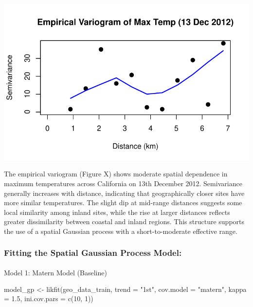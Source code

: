 \documentclass[
  11pt,
]{article}
\makeatletter
\let\oldparagraph\paragraph
\renewcommand{\paragraph}{
    \@ifstar
      \xxxParagraphStar
      \xxxParagraphNoStar
  }
\newcommand{\xxxParagraphStar}[1]{\oldparagraph*{#1}\mbox{}}
\newcommand{\xxxParagraphNoStar}[1]{\oldparagraph{#1}\mbox{}}
\newenvironment{Shaded}{\begin{snugshade}}{\end{snugshade}}
\newcommand{\AttributeTok}[1]{\textcolor[rgb]{0.40,0.45,0.13}{#1}}
\newcommand{\DecValTok}[1]{\textcolor[rgb]{0.68,0.00,0.00}{#1}}
\newcommand{\FloatTok}[1]{\textcolor[rgb]{0.68,0.00,0.00}{#1}}
\newcommand{\FunctionTok}[1]{\textcolor[rgb]{0.28,0.35,0.67}{#1}}
\newcommand{\NormalTok}[1]{\textcolor[rgb]{0.00,0.23,0.31}{#1}}
\newcommand{\OtherTok}[1]{\textcolor[rgb]{0.00,0.23,0.31}{#1}}
\newcommand{\StringTok}[1]{\textcolor[rgb]{0.13,0.47,0.30}{#1}}
\makeatother
\begin{document}
\includegraphics{project_files/figure-pdf/unnamed-chunk-68-1.pdf}

The empirical variogram (Figure X) shows moderate spatial dependence in
maximum temperatures across California on 13th December 2012.
Semivariance generally increases with distance, indicating that
geographically closer sites have more similar temperatures. The slight
dip at mid-range distances suggests some local similarity among inland
sites, while the rise at larger distances reflects greater dissimilarity
between coastal and inland regions. This structure supports the use of a
spatial Gaussian process with a short-to-moderate effective range.

\subsubsection{Fitting the Spatial Gaussian Process
Model:}\label{fitting-the-spatial-gaussian-process-model}

\paragraph{Model 1: Matern Model
(Baseline)}\label{model-1-matern-model-baseline}

\begin{Shaded}
\begin{Highlighting}[]
\NormalTok{model\_gp }\OtherTok{\textless{}{-}} \FunctionTok{likfit}\NormalTok{(geo\_data\_train, }\AttributeTok{trend =} \StringTok{"1st"}\NormalTok{, }\AttributeTok{cov.model =} \StringTok{"matern"}\NormalTok{, }\AttributeTok{kappa =} \FloatTok{1.5}\NormalTok{, }\AttributeTok{ini.cov.pars =} \FunctionTok{c}\NormalTok{(}\DecValTok{10}\NormalTok{, }\DecValTok{1}\NormalTok{))}
\end{Highlighting}
\end{Shaded}
\end{document}
